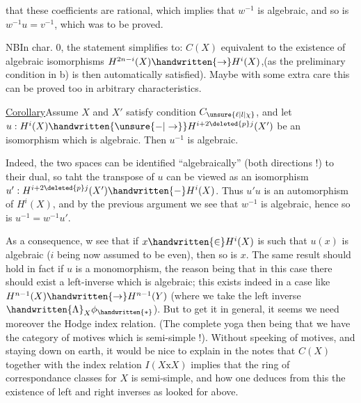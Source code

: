 that these coefficients are rational, which implies that $w^{-1}$ is algebraic,
and so is $w^{-1}u=v^{-1}$, which was to be proved.

NB\quad In char. $0$,  the statement simplifies to: $C(X)$ equivalent
to the existence of algebraic isomorphisms $H^{2n-i}(X)\handwritten{\to}H^{i}(X)$,(as the preliminary
condition in b) is then automatically satisfied). Maybe with some
extra care this can be proved too in arbitrary characteristics.

\uline{Corollary}\quad Assume $X$ and $X'$ satisfy condition $C_{\unsure{\ell|l|\chi}}$, and let
$u:H^{i}(X)\handwritten{\unsure{-|\to}}H^{i+2\deleted{p}j}(X')$  be an isomorphism which is algebraic. Then $u^{-1}$ is
algebraic.

Indeed, the two spaces can be identified ``algebraically'' (both directions !) to their dual, so taht the transpose of $u$ can be viewed as an
isomorphism $u':H^{i+2\deleted{p}j}(X')\handwritten{-}H^{i}(X)$. Thus $u'u$ is an  automorphism  of
$H^{i}(X)$, and by the previous argument we see that $w^{-1}$ is algebraic, hence
so is $u^{-1}=w^{-1}u'$.

As a consequence, w see that if $x\handwritten{\in}H^{i}(X)$ is such that $u(x)$ is
algebraic ($i$ being now assumed to be even), then so is $x$. The same result
should hold in fact if $u$ is a monomorphism, the reason being that in this
case there should exist a left-inverse which is algebraic; this exists indeed in a case like $H^{n-1}(X)\handwritten{\to}H^{n-1}(Y)$ (where we take the left inverse
$\handwritten{\Lambda}_{X}\phi_{\handwritten{*}}$). But to get it in general, it seems we need moreover the
Hodge index relation. (The complete yoga then being that we have the
category of motives which is semi-simple !). Without speeking of motives,
and staying down on earth, it would be nice to explain in the notes that
$C(X)$ together with the index relation $I(X\mathbin{\mathrm{x}}X)$ implies that the ring of
correspondance classes for $X$ is semi-simple, and how one deduces from this
the existence of left and right inverses as looked for above.

